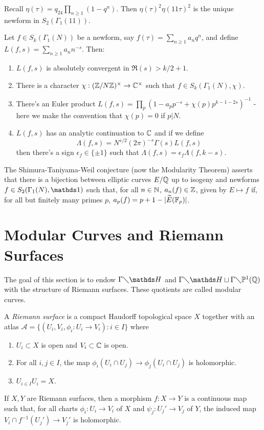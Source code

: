 \documentclass[10pt,a4paper]{article}
\begin{document}
Recall $\eta(\tau) = q_{24}\prod_{n \geq 1}(1-q^n)$. Then $\eta(\tau)^2 \eta(11\tau)^2$ is the unique newform in $S_2(\Gamma_1(11))$.

\begin{theorem}
  Let $f \in S_k(\Gamma_1(N))$ be a newform, say $f(\tau) = \sum_{n\geq 1}a_n q^n$, and define $L(f,s) = \sum_{n\geq 1}a_n n^{-s}$. Then:
  \begin{enumerate}
    \item $L(f,s)$ is absolutely convergent in $\Re(s) > k/2+1$.
    \item There is a character $\chi: (\mathbb{Z}/N\mathbb{Z})^\times \to \mathbb{C}^\times$ such that $f \in S_k(\Gamma_1(N), \chi)$.
    \item There's an Euler product $L(f,s) = \prod_p (1-a_p p^{-s}+\chi(p)p^{k-1-2s})^{-1}$ - here we make the convention that $\chi(p) = 0$ if $p |N$.
    \item $L(f,s)$ has an analytic continuation to $\mathbb{C}$ and if we define
    \[\Lambda(f,s) = N^{s/2}(2\pi)^{-s}\Gamma(s)L(f,s)\]
    then there's a sign $\epsilon_f \in \{\pm 1\}$ such that $\Lambda(f,s) = \epsilon_f \Lambda(f, k-s)$.
  \end{enumerate}
\end{theorem}
The Shimura-Taniyama-Weil conjecture (now the Modularity Theorem) asserts that there is a bijection between elliptic curves $E/\mathbb{Q}$ up to isogeny and newforms $f \in S_2(\Gamma_1(N), \one)$ such that, for all $n \in \mathbb{N}$, $a_n(f) \in \mathbb{Z}$, given by $E \mapsto f$ if, for all but finitely many primes $p$, $a_p(f) = p+1-|\widetilde{E}(\mathbb{F}_p)|$.

\section{Modular Curves and Riemann Surfaces}
The goal of this section is to endow $\Gamma \diagdown \H$ and $\Gamma \diagdown \H \sqcup \Gamma \diagdown \P^1(\Q)$ with the structure of Riemann surfaces. These quotients are called modular curves.
\begin{definition}
  A \emph{Riemann surface} is a compact Haudorff topological space $X$ together with an atlas $\mathscr{A} = \{(U_i, V_i, \phi_i:U_i \to V_i): i \in I\}$ where
  \begin{enumerate}
    \item $U_i \subset X$ is open and $V_i \subset \mathbb{C}$ is open.
    \item For all $i,j \in I$, the map $\phi_i(U_i \cap U_j) \to \phi_j(U_i \cap U_j)$ is holomorphic.
    \item $U_{i \in I}U_i = X$.
  \end{enumerate}
\end{definition}
If $X, Y$ are Riemann surfaces, then a morphism $f: X \to Y$ is a continuous map such that, for all charts $\phi_i : U_i \to V_i$ of $X$ and $\psi_j : U_j' \to V_j$ of $Y$, the induced map $V_i \cap f^{-1}(U_j') \to V_j'$ is holomorphic.
\end{document}
